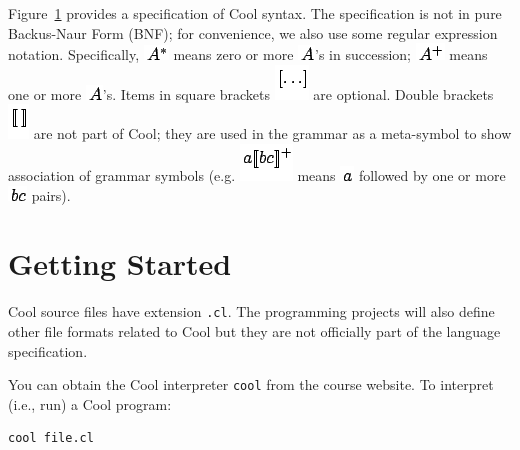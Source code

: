 \documentclass[]{article}
\begin{document}
Figure~\hyperref[fig1]{1} provides a specification of Cool syntax. The
specification is not in pure Backus-Naur Form (BNF); for convenience, we
also use some regular expression notation. Specifically,
\includegraphics{img44.png} means zero or more
\includegraphics{img45.png}'s in succession; \includegraphics{img46.png}
means one or more \includegraphics{img45.png}'s. Items in square
brackets \includegraphics{img47.png} are optional. Double brackets
\includegraphics{img48.png} are not part of Cool; they are used in the
grammar as a meta-symbol to show association of grammar symbols (e.g.
\includegraphics{img49.png} means \includegraphics{img30.png} followed
by one or more \includegraphics{img50.png} pairs).

\section{Getting Started}

Cool source files have extension \texttt{.cl}. The programming projects
will also define other file formats related to Cool but they are not
officially part of the language specification.

You can obtain the Cool interpreter \texttt{cool} from the course
website. To interpret (i.e., run) a Cool program:

\begin{verbatim}
cool file.cl 
\end{verbatim}
\end{document}

